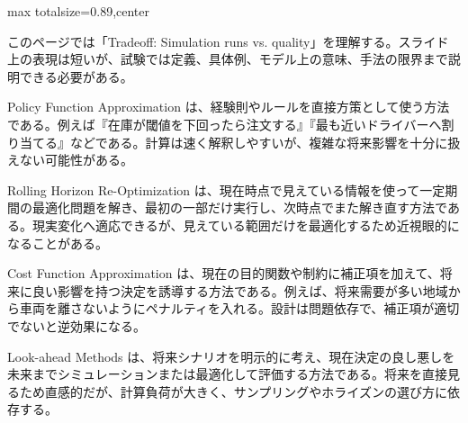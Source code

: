 \begin{minipage}[t]{0.58\textwidth}
\begin{adjustbox}{max totalsize={\textwidth}{0.89\textheight},center}
\begin{minipage}{\textwidth}\scriptsize
{}このページでは「Tradeoff: Simulation runs vs. quality」を理解する。スライド上の表現は短いが、試験では定義、具体例、モデル上の意味、手法の限界まで説明できる必要がある。\par
Policy Function Approximation は、経験則やルールを直接方策として使う方法である。例えば『在庫が閾値を下回ったら注文する』『最も近いドライバーへ割り当てる』などである。計算は速く解釈しやすいが、複雑な将来影響を十分に扱えない可能性がある。\par
Rolling Horizon Re-Optimization は、現在時点で見えている情報を使って一定期間の最適化問題を解き、最初の一部だけ実行し、次時点でまた解き直す方法である。現実変化へ適応できるが、見えている範囲だけを最適化するため近視眼的になることがある。\par
Cost Function Approximation は、現在の目的関数や制約に補正項を加えて、将来に良い影響を持つ決定を誘導する方法である。例えば、将来需要が多い地域から車両を離さないようにペナルティを入れる。設計は問題依存で、補正項が適切でないと逆効果になる。\par
Look-ahead Methods は、将来シナリオを明示的に考え、現在決定の良し悪しを未来までシミュレーションまたは最適化して評価する方法である。将来を直接見るため直感的だが、計算負荷が大きく、サンプリングやホライズンの選び方に依存する。\par

\end{minipage}
\end{adjustbox}
\end{minipage}
